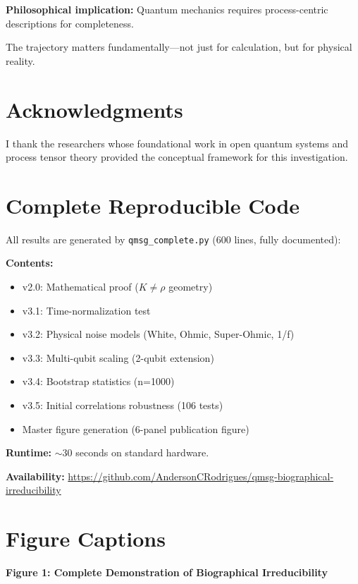 \documentclass[11pt, onecolumn, letterpaper]{article}
\begin{document}
\textbf{Philosophical implication:} Quantum mechanics requires process-centric descriptions for completeness.

The trajectory matters fundamentally---not just for calculation, but for physical reality.

\section*{Acknowledgments}
I thank the researchers whose foundational work in open quantum systems and process tensor theory provided the conceptual framework for this investigation.




\appendix

\section{Complete Reproducible Code}
All results are generated by \texttt{qmsg\_complete.py} (600 lines, fully documented):

\textbf{Contents:}
\begin{itemize}
    \item v2.0: Mathematical proof ($K \neq \rho$ geometry)
    \item v3.1: Time-normalization test
    \item v3.2: Physical noise models (White, Ohmic, Super-Ohmic, 1/f)
    \item v3.3: Multi-qubit scaling (2-qubit extension)
    \item v3.4: Bootstrap statistics (n=1000)
    \item v3.5: Initial correlations robustness (106 tests)
    \item Master figure generation (6-panel publication figure)
\end{itemize}

\textbf{Runtime:} $\sim$30 seconds on standard hardware.

\textbf{Availability:} \href{https://github.com/AndersonCRodrigues/qmsg-biographical-irreducibility}{https://github.com/AndersonCRodrigues/qmsg-biographical-irreducibility}

\section{Figure Captions}

\textbf{Figure 1: Complete Demonstration of Biographical Irreducibility}
\end{document}
